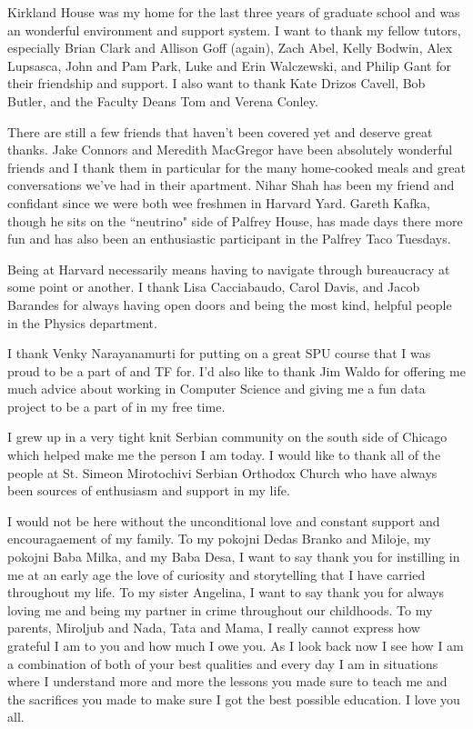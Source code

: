 Kirkland House was my home for the last three years of graduate school and was an wonderful environment and support system. I want to thank my fellow tutors, especially Brian Clark and Allison Goff (again), Zach Abel, Kelly Bodwin, Alex Lupsasca, John and Pam Park, Luke and Erin Walczewski, and Philip Gant for their friendship and support. I also want to thank Kate Drizos Cavell, Bob Butler, and the Faculty Deans Tom and Verena Conley.

There are still a few friends that haven't been covered yet and deserve great thanks. Jake Connors and Meredith MacGregor have been absolutely wonderful friends and I thank them in particular for the many home-cooked meals and great conversations we've had in their apartment. Nihar Shah has been my friend and confidant since we were both wee freshmen in Harvard Yard. Gareth Kafka, though he sits on the ``neutrino" side of Palfrey House, has made days there more fun and has also been an enthusiastic participant in the Palfrey Taco Tuesdays.  

Being at Harvard necessarily means having to navigate through bureaucracy at some point or another. I thank Lisa Cacciabaudo, Carol Davis, and Jacob Barandes for always having open doors and being the most kind, helpful people in the Physics department. 

I thank Venky Narayanamurti for putting on a great SPU course that I was proud to be a part of and TF for. I'd also like to thank Jim Waldo for offering me much advice about working in Computer Science and giving me a fun data project to be a part of in my free time. 

I grew up in a very tight knit Serbian community on the south side of Chicago which helped make me the person I am today. I would like to thank all of the people at St. Simeon Mirotochivi Serbian Orthodox Church who have always been sources of enthusiasm and support in my life. 

I would not be here without the unconditional love and constant support and encouragaement of my family. To my pokojni Dedas Branko and Miloje, my pokojni Baba Milka, and my Baba Desa, I want to say thank you for instilling in me at an early age the love of curiosity and storytelling that I have carried throughout my life. To my sister Angelina, I want to say thank you for always loving me and being my partner in crime throughout our childhoods. To my parents, Miroljub and Nada, Tata and Mama, I really cannot express how grateful I am to you and how much I owe you. As I look back now I see how I am a combination of both of your best qualities and every day I am in situations where I understand more and more the lessons you made sure to teach me and the sacrifices you made to make sure I got the best possible education. I love you all. 

